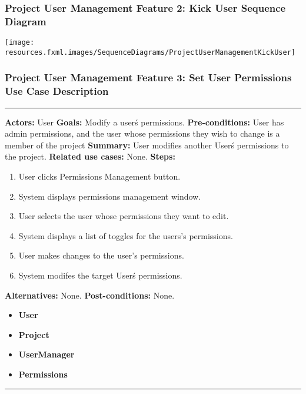 \documentclass[twoside,letterpaper]{article}
\begin{document}
\subsubsection[Project User Management Feature 2: Kick User Sequence Diagram]{\rmfamily\bfseries\color{black}
	Project User Management Feature 2: Kick User Sequence Diagram}
\hypertarget{RefHeading22059017292}{}
\texttt{[image: resources.fxml.images/SequenceDiagrams/ProjectUserManagementKickUser]}
\newpage

\subsubsection[Project User Management Feature 3: Set User Permissions Use Case Description ]{\rmfamily\bfseries\color{black}
	Project User Management Feature 3: Set User Permissions Use Case Description}
\hypertarget{RefHeading22059017292}{}

\vspace{2pt}
\hrule
\vspace{8pt}
 \textbf{Actors:} User \newline
\textbf{Goals:} Modify a user\'s permissions. \newline
 \textbf{Pre-conditions:} User has admin permissions, and the user whose permissions they wish to change is a member of the project\newline
 \textbf{Summary:} User modifies another User\'s permissions to the project. \newline
 \textbf{Related use cases:} None. \newline
\textbf{Steps:} \begin{enumerate}
  \item User clicks Permissions Management button.
  \item System displays permissions management window.
  \item User selects the user whose permissions they want to edit.
  \item System displays a list of toggles for the users's permissions.
  \item User makes changes to the user's permissions.
  \item System modifes the target User\'s permissions.
 \end{enumerate}
 \textbf{Alternatives:} None. \newline
 \textbf{Post-conditions:} None. \newline
\begin{itemize}
	\item \textbf{User}
	\item \textbf{Project}
	\item \textbf{UserManager}
	\item \textbf{Permissions}
\end{itemize}
\vspace{8pt}
\hrule
\newpage
\end{document}
